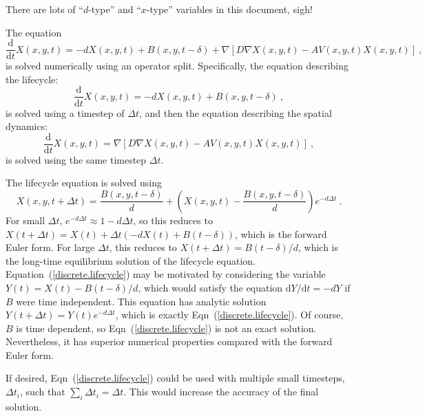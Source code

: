 \documentclass[11pt,a4paper]{article}
\begin{document}
There are lots of ``$d$-type'' and ``$x$-type'' variables in this document, sigh!

The equation
\begin{equation}
  \frac{\mathrm{d}}{\mathrm{d}t}X(x, y, t) = -dX(x, y, t) + B(x, y, t - \delta) + \nabla\left[D\nabla X(x, y, t) - AV(x, y, t)X(x, y, t)\right] \ ,
\end{equation}
is solved numerically using an operator split.  Specifically, the equation describing the lifecycle:
\begin{equation}
  \frac{\mathrm{d}}{\mathrm{d}t}X(x, y, t) = -dX(x, y, t) + B(x, y, t - \delta) \ ,
\end{equation}
is solved using a timestep of $\Delta t$, and then the equation describing the spatial dynamics:
\begin{equation}
  \frac{\mathrm{d}}{\mathrm{d}t}X(x, y, t) = \nabla\left[D\nabla X(x, y, t) - AV(x, y, t)X(x, y, t)\right] \ ,
\end{equation}
is solved using the same timestep $\Delta t$.

The lifecycle equation is solved using
\begin{equation}
  X(x, y, t + \Delta t) = \frac{B(x, y, t - \delta)}{d} + \left(X(x, y, t) - \frac{B(x, y, t - \delta)}{d}\right)e^{ - d\Delta t} \ . \label{discrete.lifecycle}
\end{equation}
For small $\Delta t$, $e^{-d\Delta t} \approx 1 - d\Delta t$, so this reduces to $X(t + \Delta t) = X(t) + \Delta t (-dX(t) + B(t - \delta))$, which is the forward Euler form.  For large $\Delta t$, this reduces to $X(t + \Delta t) = B(t - \delta) / d$, which is the long-time equilibrium solution of the lifecycle equation.  Equation~(\ref{discrete.lifecycle}) may be motivated by considering the variable $Y(t) = X(t) - B(t - \delta)/d$, which would satisfy the equation $\mathrm{d}Y/\mathrm{d}t = -d Y$ if $B$ were time independent.  This equation has analytic solution $Y(t + \Delta t) = Y(t) e^{-d \Delta t}$, which is exactly Eqn~(\ref{discrete.lifecycle}).  Of course, $B$ is time dependent, so Eqn~(\ref{discrete.lifecycle}) is not an exact solution.  Nevertheless, it has superior numerical properties compared with the forward Euler form.

If desired, Eqn~(\ref{discrete.lifecycle}) could be used with multiple small timesteps, $\Delta t_{i}$, such that $\sum_{i}\Delta t_{i} = \Delta t$.  This would increase the accuracy of the final solution.
\end{document}
